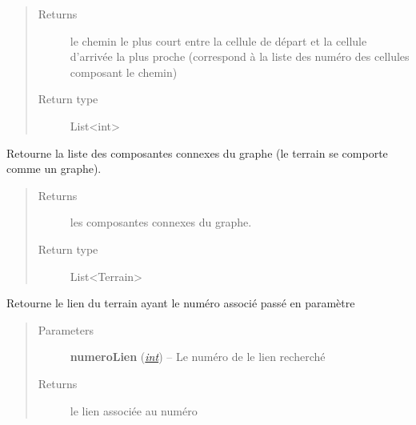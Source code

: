 \documentclass[letterpaper,10pt,english]{sphinxmanual}
\begin{document}
\begin{fulllineitems}
\begin{fulllineitems}
\begin{quote}
\begin{description}
\begin{itemize}
\end{itemize}

\item[{Returns}] \leavevmode
le chemin le plus court entre la cellule de départ et la cellule d'arrivée la plus proche (correspond à la liste des numéro des cellules composant le chemin)

\item[{Return type}] \leavevmode
List\textless{}int\textgreater{}

\end{description}\end{quote}

\end{fulllineitems}


\begin{fulllineitems}
\label{index:Terrain.Terrain.getComposantesConnexes}
Retourne la liste des composantes connexes du graphe (le terrain se comporte comme un graphe).
\begin{quote}\begin{description}
\item[{Returns}] \leavevmode
les composantes connexes du graphe.

\item[{Return type}] \leavevmode
List\textless{}Terrain\textgreater{}

\end{description}\end{quote}

\end{fulllineitems}


\begin{fulllineitems}
\label{index:Terrain.Terrain.getLien}
Retourne le lien du terrain ayant le numéro associé passé en paramètre
\begin{quote}\begin{description}
\item[{Parameters}] \leavevmode
\textbf{numeroLien} (\href{http://docs.python.org/library/functions.html\#int}{\emph{int}}) -- Le numéro de le lien recherché

\item[{Returns}] \leavevmode
le lien associée au numéro


\end{description}
\end{quote}
\end{fulllineitems}
\end{fulllineitems}
\end{document}
